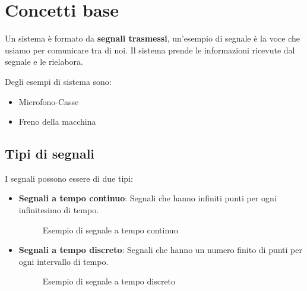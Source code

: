 \documentclass[a4paper]{article}
\theoremstyle{break}
\theoremstyle{break}
\theoremstyle{break}
\theoremstyle{break}
\begin{document}


\tableofcontents
\pagebreak

\section{Concetti base}
Un sistema è formato da \textbf{segnali trasmessi}, un'esempio di segnale
è la voce che usiamo per comunicare tra di noi. Il sistema prende le informazioni
ricevute dal segnale e le rielabora. 

\noindent 
Degli esempi di sistema sono:
\begin{itemize}
  \item Microfono-Casse
  \item Freno della macchina
\end{itemize}

\subsection{Tipi di segnali}
I segnali possono essere di due tipi:

\begin{itemize}
  \item \textbf{Segnali a tempo continuo}: Segnali che hanno infiniti punti per ogni
    infinitesimo di tempo.
    \begin{figure}[H]
      \centering
      \caption{Esempio di segnale a tempo continuo}
    \end{figure}
  \item \textbf{Segnali a tempo discreto}: Segnali che hanno un numero finito di punti
    per ogni intervallo di tempo.
    \begin{figure}[H]
      \centering
      \caption{Esempio di segnale a tempo discreto}
    \end{figure}

\end{itemize}
\end{document}
